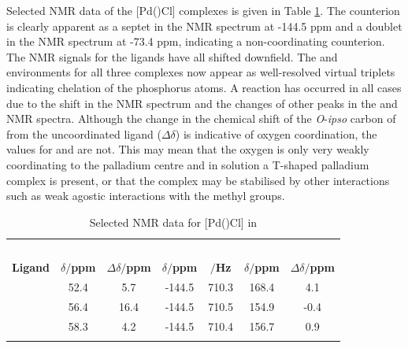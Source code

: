 Selected NMR data of the [Pd(\tBuxantphosk)Cl] complexes is given in Table \ref{table:PdPF6NMR}.  The  counterion is clearly apparent as a septet in the \phosphorus{} NMR spectrum at -144.5 ppm and a doublet in the \fluorine{} NMR spectrum at -73.4 ppm, indicating a non-coordinating counterion.  The \phosphorus{} NMR signals for the \tBuxantphos{} ligands have all shifted downfield.  The \tBu{} \proton{} and \carbon{} environments for all three complexes now appear as well-resolved virtual triplets indicating \trans{} chelation of the phosphorus atoms.  A reaction has occurred in all cases due to the shift in the \phosphorus{} NMR spectrum and the changes of other peaks in the \proton{} and \carbon{} NMR spectra.  Although the change in the chemical shift of the \emph{O}-\emph{ipso} carbon of \tBusixantphos{} from the uncoordinated ligand ($\Delta\delta$) is indicative of oxygen coordination, the values for \tButhixantphos{} and \tBuxantphos{} are not.  This may mean that the oxygen is only very weakly coordinating to the palladium centre and in solution a T-shaped palladium complex is present, or that the complex may be stabilised by other interactions such as weak agostic interactions with the \tBu{} methyl groups.  

\begin{table}[htbp]
\caption[Selected NMR data for [Pd(\tBuxantphos)Cl{]} complexes]{Selected NMR data for [Pd(\tBuxantphos)Cl] in }
\label{table:PdPF6NMR}
\small
\begin{center}
\begin{tabular}{l c c c c c c}
	\toprule{}
	~~ & \multicolumn{4}{c}{\bfseries{\phosphorus}} & \multicolumn{2}{c}{\bfseries{\carbon}}\\
	\cmidrule(lr){2-5} \cmidrule(lr){6-7}
	\bfseries{Ligand}&\bfseries{$\delta/$ppm}&\bfseries{$\Delta\delta/$ppm}& \bfseries{$\delta/$ppm} & \bfseries{\JPF$/$Hz} & \bfseries{$\delta/$ppm}&\bfseries{$\Delta\delta/$ppm}\\
	\midrule
	\tBuSixantphos		& 52.4	& 5.7		& -144.5	& 710.3	& 168.4	& 4.1	\\
	\tBuThixantphos 	& 56.4	& 16.4	& -144.5	& 710.5	& 154.9	& -0.4	\\
	\tBuXantphos		& 58.3	& 4.2		& -144.5	& 710.4	& 156.7	& 0.9 \\
	\bottomrule{}
\end{tabular}
\end{center}
\end{table}

